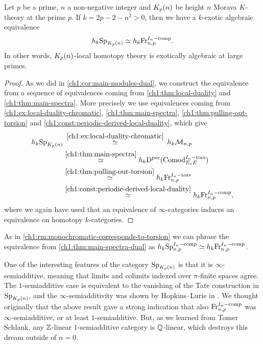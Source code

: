\begin{theorem}
    \label{ch1:thm:main-spectra-dual}
    Let $p$ be a prime, $n$ a non-negative integer and ${K_p(n)}$ be height $n$ Morava $K$-theory at the prime $p$. If $k=2p-2-n^2>0$, then we have a $k$-exotic algebraic equivalence 
    \[h_k \mathrm{Sp}_{{K_p(n)}} \simeq h_k \mathrm{Fr}_{n,p}^{I_n-\mathrm{comp}}.\]
    In other words, ${K_p(n)}$-local homotopy theory is exotically algebraic at large primes. 
\end{theorem}
\begin{proof}
    As we did in \cref{ch1:cor:main-modules-dual}, we construct the equivalence from a sequence of equivalences coming from \cref{ch1:thm:local-duality} and \cref{ch1:thm:main-spectra}. More precisely we use equivalences coming from \cref{ch1:ex:local-duality-chromatic}, \cref{ch1:thm:main-spectra}, \cref{ch1:thm:pulling-out-torsion} and \cref{ch1:const:periodic-derived-local-duality}, which give
    \begin{align*}
        h_k \mathrm{Sp}_{{K_p(n)}}
        &\overset{\hspace{2pt}\ref{ch1:ex:local-duality-chromatic}\hspace{2pt}}
        \simeq 
        h_k \mathcal{M}_{n,p} \\
        &\overset{\ref{ch1:thm:main-spectra}}
        \simeq 
        h_k \mathrm{D}^{\mathrm{per}}(\mathrm{Comod}_{E_*E}^{I_n-\mathrm{tors}}) \\
        &\overset{\ref{ch1:thm:pulling-out-torsion}}
        \simeq 
        h_k \mathrm{Fr}_{n,p}^{I_n-\mathrm{tors}} \\
        &\overset{\ref{ch1:const:periodic-derived-local-duality}}
        \simeq 
        h_k \mathrm{Fr}_{n,p}^{I_n-\mathrm{comp}},
    \end{align*}
    where we again have used that an equivalence of $\infty$-categories induces an equivalence on homotopy $k$-categories.
\end{proof}

\begin{remark}
    As in \cref{ch1:rm:monochromatic-corresponds-to-torsion} we can phrase the equivalence from \cref{ch1:thm:main-spectra-dual} as $h_k\mathrm{Sp}_{n,p}^{I_n-\mathrm{comp}}\simeq h_k\mathrm{Fr}_{n,p}^{I_n-\mathrm{comp}}$. 
\end{remark}

\begin{addendum}
    One of the interesting features of the category $\mathrm{Sp}_{{K_p(n)}}$ is that it is $\infty$-semiadditive, meaning that limits and colimits indexed over $\pi$-finite spaces agree. The $1$-semiadditive case is equivalent to the vanishing of the Tate construction in $\mathrm{Sp}_{{K_p(n)}}$, and the $\infty$-semiadditivity was shown by Hopkins--Lurie in \cite{hopkins-lurie_17}. We thought originally that the above result gave a strong indication that also $\mathrm{Fr}_{n,p}^{I_n-\mathrm{comp}}$ was $\infty$-semiadditive, or at least $1$-semiadditive. But, as we learned from Tomer Schlank, any $\mathbb{Z}$-linear $1$-semiadditive category is $\mathbb{Q}$-linear, which destroys this dream outside of $n=0$. 
\end{addendum}






